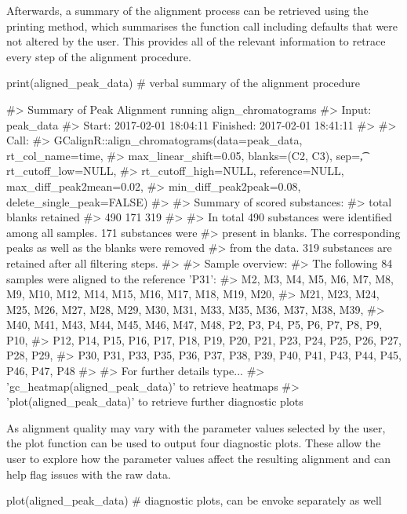 Afterwards, a summary of the alignment process can be retrieved using
the printing method, which summarises the function call including
defaults that were not altered by the user. This provides all of the
relevant information to retrace every step of the alignment procedure.

\begin{Schunk}
\begin{Sinput}
print(aligned_peak_data) # verbal summary of the alignment procedure
\end{Sinput}
\begin{Soutput}
#> Summary of Peak Alignment running align_chromatograms
#> Input: peak_data
#> Start:  2017-02-01 18:04:11  Finished:  2017-02-01 18:41:11 
#> 
#> Call:
#>   GCalignR::align_chromatograms(data=peak_data, rt_col_name=time,
#>   max_linear_shift=0.05, blanks=(C2, C3), sep=\t, rt_cutoff_low=NULL,
#>   rt_cutoff_high=NULL, reference=NULL, max_diff_peak2mean=0.02,
#>   min_diff_peak2peak=0.08, delete_single_peak=FALSE)
#> 
#> Summary of scored substances:
#>    total   blanks retained 
#>      490      171      319 
#> 
#> In total 490 substances were identified among all samples. 171 substances were
#>   present in blanks. The corresponding peaks as well as the blanks were removed
#>   from the data. 319 substances are retained after all filtering steps.
#> 
#> Sample overview:
#>   The following 84 samples were aligned to the reference 'P31':
#>   M2, M3, M4, M5, M6, M7, M8, M9, M10, M12, M14, M15, M16, M17, M18, M19, M20,
#>   M21, M23, M24, M25, M26, M27, M28, M29, M30, M31, M33, M35, M36, M37, M38, M39,
#>   M40, M41, M43, M44, M45, M46, M47, M48, P2, P3, P4, P5, P6, P7, P8, P9, P10,
#>   P12, P14, P15, P16, P17, P18, P19, P20, P21, P23, P24, P25, P26, P27, P28, P29,
#>   P30, P31, P33, P35, P36, P37, P38, P39, P40, P41, P43, P44, P45, P46, P47, P48
#> 
#> For further details type...
#>   'gc_heatmap(aligned_peak_data)' to retrieve heatmaps
#>   'plot(aligned_peak_data)' to retrieve further diagnostic plots
\end{Soutput}
\end{Schunk}

As alignment quality may vary with the parameter values selected by the
user, the plot function can be used to output four diagnostic plots.
These allow the user to explore how the parameter values affect the
resulting alignment and can help flag issues with the raw data.

\begin{Schunk}
\begin{Sinput}
plot(aligned_peak_data) # diagnostic plots, can be envoke separately as well
\end{Sinput}
\end{Schunk}

